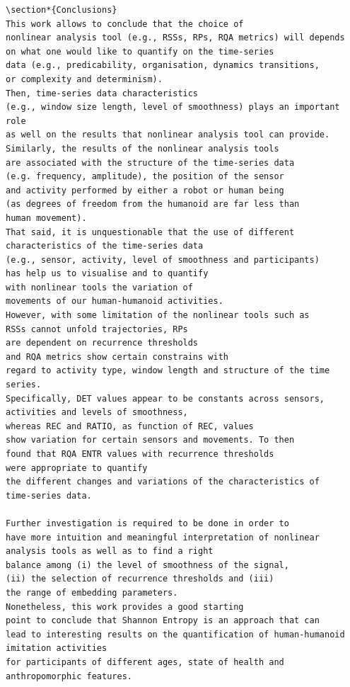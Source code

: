 \documentclass[10pt]{article}
\begin{document}
\begin{enumerate}
\begin{verbatim}
\section*{Conclusions}
This work allows to conclude that the choice of 
nonlinear analysis tool (e.g., RSSs, RPs, RQA metrics) will depends 
on what one would like to quantify on the time-series 
data (e.g., predicability, organisation, dynamics transitions, 
or complexity and determinism).
Then, time-series data characteristics 
(e.g., window size length, level of smoothness) plays an important role
as well on the results that nonlinear analysis tool can provide.
Similarly, the results of the nonlinear analysis tools
are associated with the structure of the time-series data 
(e.g. frequency, amplitude), the position of the sensor 
and activity performed by either a robot or human being
(as degrees of freedom from the humanoid are far less than
human movement). 
That said, it is unquestionable that the use of different 
characteristics of the time-series data 
(e.g., sensor, activity, level of smoothness and participants)
has help us to visualise and to quantify 
with nonlinear tools the variation of 
movements of our human-humanoid activities.
However, with some limitation of the nonlinear tools such as 
RSSs cannot unfold trajectories, RPs 
are dependent on recurrence thresholds
and RQA metrics show certain constrains with 
regard to activity type, window length and structure of the time series.
Specifically, DET values appear to be constants across sensors, 
activities and levels of smoothness, 
whereas REC and RATIO, as function of REC, values 
show variation for certain sensors and movements. To then 
found that RQA ENTR values with recurrence thresholds  
were appropriate to quantify 
the different changes and variations of the characteristics of 
time-series data.

Further investigation is required to be done in order to 
have more intuition and meaningful interpretation of nonlinear 
analysis tools as well as to find a right 
balance among (i) the level of smoothness of the signal, 
(ii) the selection of recurrence thresholds and (iii) 
the range of embedding parameters. 
Nonetheless, this work provides a good starting 
point to conclude that Shannon Entropy is an approach that can
lead to interesting results on the quantification of human-humanoid imitation activities 
for participants of different ages, state of health and anthropomorphic features.






\end{verbatim}
\end{enumerate}
\end{document}
